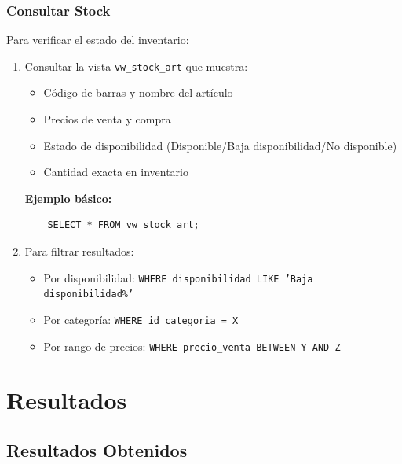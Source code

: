 \documentclass[a4paper, 12pt]{article}
\begin{document}
\subsubsection{Consultar Stock}
Para verificar el estado del inventario:
\begin{enumerate}
    \item Consultar la vista \texttt{vw\_stock\_art} que muestra:
    \begin{itemize}
        \item Código de barras y nombre del artículo
        \item Precios de venta y compra
        \item Estado de disponibilidad (Disponible/Baja disponibilidad/No disponible)
        \item Cantidad exacta en inventario
    \end{itemize}
    \newpage
    \textbf{Ejemplo básico:}
    \begin{verbatim}
    SELECT * FROM vw_stock_art;
    \end{verbatim}
    \item Para filtrar resultados:
    \begin{itemize}
        \item Por disponibilidad: \texttt{WHERE disponibilidad LIKE 'Baja disponibilidad\%'}
        \item Por categoría: \texttt{WHERE id\_categoria = X}
        \item Por rango de precios: \texttt{WHERE precio\_venta BETWEEN Y AND Z}
    \end{itemize}
\end{enumerate}

\section{Resultados}
\subsection{Resultados Obtenidos}
\end{document}
